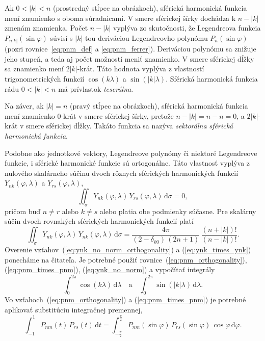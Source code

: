 \documentclass[a4paper, 12pt]{book}
\newcommand{\diff}{\mathrm d}
\begin{document}
Ak $0 < |k| < n$ (prostredný stĺpec na obrázkoch), sférická harmonická funkcia 
mení znamienko s oboma súradnicami.  V smere sférickej šírky dochádza k $n 
- |k|$ zmenám znamienka.  Počet $n - |k|$ vyplýva zo skutočnosti, že 
Legendreova funkcia $P_{n|k|}(\sin\varphi)$ súvisí s $|k|$-tou deriváciou 
Legendreovho polynómu $P_n(\sin\varphi)$ (pozri rovnice~\ref{eq:pnm_def} 
a \ref{eq:pnm_ferrer}).  Deriváciou polynómu sa znižuje jeho stupeň, a teda aj 
počet možností meniť znamienko.  V smere sférickej dĺžky sa znamienko mení 
$2|k|$-krát.  Táto hodnota vyplýva z vlastností trigonometrických funkcií 
$\cos(k\lambda)$ a $\sin(|k|\lambda)$.  Sférická harmonická funkcia rádu $0 
< |k| < n$ má prívlastok \emph{teserálna}.

Na záver, ak $|k| = n$ (pravý stĺpec na obrázkoch), sférická harmonická funkcia 
mení znamienko $0$-krát v smere sférickej šírky, pretože $n - |k| = n - n = 0$, 
a $2|k|$-krát v smere sférickej dĺžky.  Takáto funkcia sa nazýva 
\emph{sektorálna sférická harmonická funkcia}.

Podobne ako jednotkové vektory, Legendreove polynómy či niektoré Legendreove 
funkcie, i sférické harmonické funkcie sú ortogonálne.  Táto vlastnosť vyplýva 
z nulového skalárneho súčinu dvoch rôznych sférických harmonických funkcií 
$Y_{nk}(\varphi, \lambda)$ a $Y_{rs}(\varphi, \lambda)$,
%
\begin{equation}
\label{eq:ynk_no_norm_orthogonality}
\iint_{\sigma} Y_{nk}(\varphi, \lambda) \, Y_{rs}(\varphi, \lambda) \, \diff 
\sigma = 0{,}
\end{equation}
%
pričom buď $n \neq r$ alebo $k \neq s$ alebo platia obe podmienky súčasne.  Pre 
skalárny súčin dvoch rovnakých sférických harmonických funkcií platí
%
\begin{equation}
\label{eq:ynk_times_ynk}
\iint_{\sigma} Y_{nk}(\varphi, \lambda) \, Y_{nk}(\varphi, \lambda) \, \diff 
\sigma =
%
\dfrac{4\pi}{(2 - \delta_{k0}) \, (2n + 1)} \, \dfrac{(n + |k|)!}{(n 
- |k|)!}{.}
\end{equation}
%
Overenie vzťahov~(\ref{eq:ynk_no_norm_orthogonality}) 
a (\ref{eq:ynk_times_ynk}) ponecháme na čitateľa.  Je potrebné použiť 
rovnice~(\ref{eq:pnm_orthogonality}), (\ref{eq:pnm_times_pnm}), 
(\ref{eq:ynk_no_norm}) a vypočítať integrály
%
\begin{equation}
\int_{0}^{2\pi} \cos(k \lambda) \, \diff\lambda \quad \text{a} \quad 
\int_{0}^{2\pi} \sin(|k| \lambda) \, \diff\lambda{.}
\end{equation}
%
Vo vzťahoch~(\ref{eq:pnm_orthogonality}) a (\ref{eq:pnm_times_pnm}) je potrebné 
aplikovať substitúciu integračnej premennej,
%
\begin{equation}
\int_{-1}^{1} P_{nm}(t) \, P_{rs}(t) \, \diff 
t = \int_{-\frac{\pi}{2}}^{\frac{\pi}{2}} P_{nm}(\sin\varphi) \, 
P_{rs}(\sin\varphi) \, \cos\varphi \, \diff \varphi{.}
\end{equation}
\end{document}
